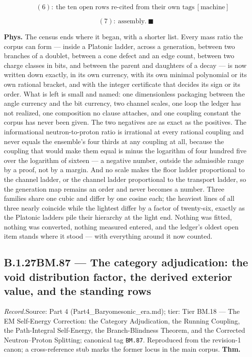 \documentclass[11pt,openany]{report}
\theoremstyle{canonplain}
\theoremstyle{canondef}
\begin{document}
\[
\qquad (6):\ \text{the ten open rows re-cited from their own tags}\ [\text{machine}]
\]

\[
(7):\ \text{assembly}.\ \blacksquare
\]

\textbf{Phys.} The census ends where it began, with a shorter list. Every mass ratio the corpus can form — inside a Platonic ladder, across a generation, between two branches of a doublet, between a cone defect and an edge count, between two charge classes in bits, and between the parent and daughters of a decay — is now written down exactly, in its own currency, with its own minimal polynomial or its own rational bracket, and with the integer certificate that decides its sign or its order. What is left is small and named: one dimensionless packaging between the angle currency and the bit currency, two channel scales, one loop the ledger has not realized, one composition no clause attaches, and one coupling constant the corpus has never been given. The two negatives are as exact as the positives. The informational neutron-to-proton ratio is irrational at every rational coupling and never equals the ensemble's four thirds at any coupling at all, because the coupling that would make them equal is minus the logarithm of four hundred five over the logarithm of sixteen — a negative number, outside the admissible range by a proof, not by a margin. And no scale makes the floor ladder proportional to the channel ladder, or the channel ladder proportional to the transport ladder, so the generation map remains an order and never becomes a number. Three families share one cubic and differ by one cosine each; the heaviest lines of all three nearly coincide while the lightest differ by a factor of twenty-six, exactly as the Platonic ladders pile their hierarchy at the light end. Nothing was fitted, nothing was converted, nothing measured entered, and the ledger's oldest open item stands where it stood — with everything around it now counted.

\medskip
\subsection*{\texorpdfstring{B.1.27\quad BM.87 — The category adjudication: the void distribution factor, the derived exterior value, and the standing rows}{BM.87 B.1.27}}
\label{tag:BM-87}
{\small \textit{Record.}\quad Source: Part 4 (Part4\_Baryomesonic\_era.md); tier: Tier BM.18 — The EM Self-Energy Correction: the Category Adjudication, the Running Coupling, the Path-Integral Self-Energy, the Branch-Blindness Theorem, and the Corrected Neutron–Proton Splitting; canonical tag \texttt{BM.87}. Reproduced from the revision-1 canon; a cross-reference stub marks the former locus in the main corpus.}
\medskip
\textbf{Thm.}
\end{document}
